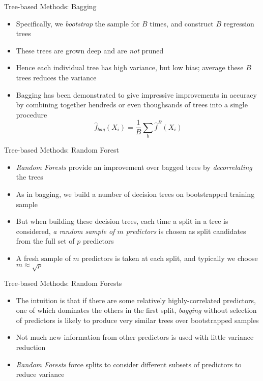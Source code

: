 \documentclass[aspectratio=1610,12pt,xcolor=dvipsnames]{beamer}
\begin{document}
\begin{frame}{Tree-based Methods: Bagging}

    \begin{itemize}
        \item Specifically, we \textit{bootstrap} the sample for $B$ times, and construct $B$ regression trees
        \item These trees are grown deep and are \textit{not} pruned
        \item Hence each individual tree has high variance, but low bias; average these $B$ trees reduces the variance
        \item Bagging has been demonstrated to give impressive improvements in accuracy by combining together hendreds or even thoughsands of trees into a single procedure
        \[
        \hat f_{bag}(X_i) = \frac{1}{B}\sum_b \hat f^B(X_i)
        \]
    \end{itemize}
\end{frame}

\begin{frame}{Tree-based Methods: Random Forest}

\begin{itemize}
    \item \textit{Random Forests} provide an improvement over bagged trees by \textit{decorrelating} the trees
    \item As in bagging, we build a number of decision trees on bootstrapped training sample
    \item But when building these decision trees, each time a split in a tree is considered, \textit{a random sample of $m$ predictors} is chosen as split candidates from the full set of $p$ predictors
    \item A fresh sample of $m$ predictors is taken at each split, and typically we choose $m\approx \sqrt{p}$
\end{itemize}
\end{frame}

\begin{frame}{Tree-based Methods: Random Forests}

\begin{itemize}
    \item The intuition is that if there are some relatively highly-correlated predictors, one of which dominates the others in the first split, \textit{bagging} without selection of predictors is likely to produce very similar trees over bootstrapped samples
    \item Not much new information from other predictors is used with little variance reduction
    \item \textit{Random Forests} force splits to consider different subsets of predictors to reduce variance
\end{itemize}
    
\end{frame}
\end{document}
